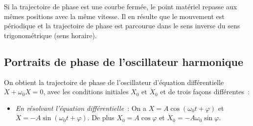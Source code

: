 Si la trajectoire de phase est une courbe fermée, le point matériel repasse aux mêmes positions avec la même vitesse. Il en résulte que le mouvement est périodique et la trajectoire de phase est parcourue dans le sens inverse du sens trigonométrique (sens horaire).

\subsection{Portraits de phase de l'oscillateur harmonique}
\label{chap5-subsec:portraitdephaseoscillateurharmonique}

On obtient la trajectoire de phase de l'oscillateur d'équation différentielle $\ddot{X}+\omega_0 X=0$, avec les conditions initiales $X_0$ et $\dot{X}_0$ et de trois façons différentes~:
\begin{itemize}
\item \emph{En résolvant l'équation différentielle}~: On a $X=A\cos(\omega_0 t+\varphi)$ et $\dot{X}=-A\sin(\omega_0 t+\varphi)$. De plus $X_0=A\cos\varphi$ et $\dot{X}_0=-A\omega_0\sin\varphi$.


\end{itemize}
